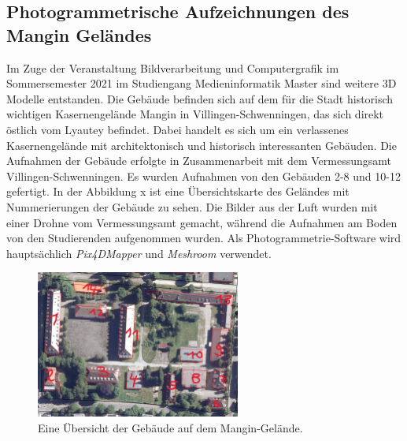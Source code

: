 \subsection{Photogrammetrische Aufzeichnungen des Mangin Geländes}
Im Zuge der Veranstaltung Bildverarbeitung und Computergrafik im Sommersemester 2021 im Studiengang Medieninformatik Master sind weitere 3D Modelle entstanden\cite{kusch2021}. Die Gebäude befinden sich auf dem für die Stadt historisch wichtigen Kasernengelände Mangin in Villingen-Schwenningen, das sich direkt östlich vom Lyautey befindet. Dabei handelt es sich um ein verlassenes Kasernengelände mit architektonisch und historisch interessanten Gebäuden. Die Aufnahmen der Gebäude erfolgte in Zusammenarbeit mit dem Vermessungsamt Villingen-Schwenningen. Es wurden Aufnahmen von den Gebäuden 2-8 und 10-12 gefertigt. In der Abbildung x ist eine Übersichtskarte des Geländes mit Nummerierungen der Gebäude zu sehen.  Die Bilder aus der Luft wurden mit einer Drohne vom Vermessungsamt gemacht, während die Aufnahmen am Boden von den Studierenden aufgenommen wurden. Als Photogrammetrie-Software wird hauptsächlich \textit{Pix4DMapper} und \textit{Meshroom} verwendet. 

\begin{figure}[h]
    \centering
    \includegraphics[width=0.6\textwidth]{img/vorangegangene_Projekte/mangin_map.jpg}
    \caption{Eine Übersicht der Gebäude auf dem Mangin-Gelände.}
    \label{fig:mangin-map}
\end{figure}
